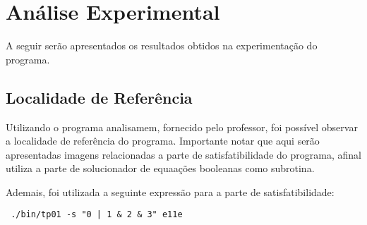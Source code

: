 \documentclass{article}
\begin{document}
\section{Análise Experimental}

A seguir serão apresentados os resultados obtidos na experimentação do programa.

\subsection{Localidade de Referência}

Utilizando o programa analisamem, fornecido pelo professor, foi possível observar a localidade de referência do programa. Importante notar que aqui serão apresentadas imagens relacionadas a parte de satisfatibilidade do programa, afinal utiliza a parte de solucionador de equaações booleanas como subrotina.


Ademais, foi utilizada a seguinte expressão para a parte de satisfatibilidade:

\verb# ./bin/tp01 -s "0 | 1 & 2 & 3" e11e#

        

\end{document}
